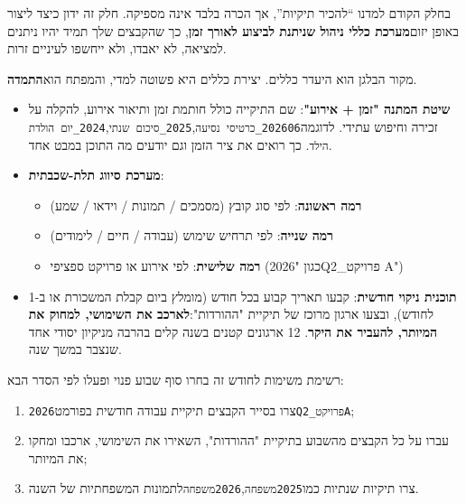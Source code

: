 
בחלק הקודם למדנו “להכיר תיקיות”, אך הכרה בלבד אינה מספיקה. חלק זה ידון כיצד ליצור באופן יזום\textbf{מערכת כללי ניהול שניתנת לביצוע לאורך זמן}, כך שהקבצים שלך תמיד יהיו ניתנים למציאה, לא יאבדו, ולא ייחשפו לעיניים זרות.


מקור הבלגן הוא היעדר כללים. יצירת כללים היא פשוטה למדי, והמפתח הוא\textbf{התמדה}.

\begin{itemize}
  \item \textbf{שיטת המתנה "זמן + אירוע"}: שם התיקייה כולל חותמת זמן ותיאור אירוע, להקלה על זכירה וחיפוש עתידי. לדוגמה\texttt{202606\_כרטיסי נסיעה},\texttt{2025\_סיכום שנתי},\texttt{2024\_יום הולדת הילד}. כך רואים את ציר הזמן וגם יודעים מה התוכן במבט אחד.
  \item \textbf{מערכת סיווג תלת-שכבתית}:
  \begin{itemize}
    \item \textbf{רמה ראשונה}: לפי סוג קובץ (מסמכים / תמונות / וידאו / שמע)
    \item \textbf{רמה שנייה}: לפי תרחיש שימוש (עבודה / חיים / לימודים)
    \item \textbf{רמה שלישית}: לפי אירוע או פרויקט ספציפי (כגון "2026Q2\_פרויקט A")
  \end{itemize}
  \item \textbf{תוכנית ניקוי חודשית}: קבעו תאריך קבוע בכל חודש (מומלץ ביום קבלת המשכורת או ב-1 לחודש), ובצעו ארגון מרוכז של תיקיית "ההורדות":\textbf{לארכב את השימושי, למחוק את המיותר, להעביר את היקר}. 12 ארגונים קטנים בשנה קלים בהרבה מניקיון יסודי אחד שנצבר במשך שנה.
\end{itemize}

\begin{tcbpractice}{רשימת משימות לחודש זה}
בחרו סוף שבוע פנוי ופעלו לפי הסדר הבא:

\begin{enumerate}
  \item צרו בסייר הקבצים תיקיית עבודה חודשית בפורמט\texttt{2026Q2\_פרויקטA};
  \item עברו על כל הקבצים מהשבוע בתיקיית "ההורדות", השאירו את השימושי, ארכבו ומחקו את המיותר;
  \item צרו תיקיות שנתיות כמו\texttt{2025משפחה},\texttt{2026משפחה}לתמונות המשפחתיות של השנה.
\end{enumerate}

\end{tcbpractice}

